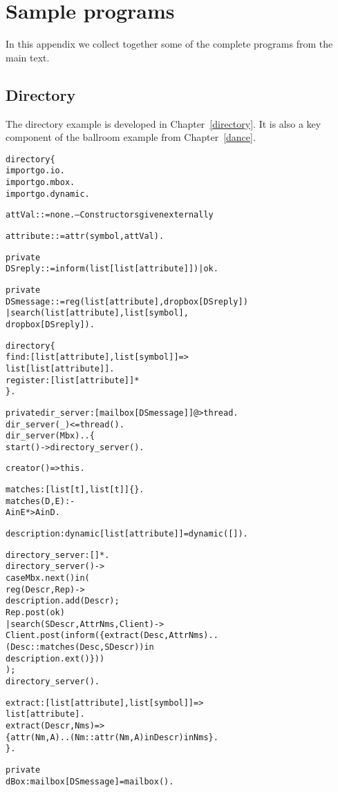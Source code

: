 \chapter{Sample programs}
\label{sample}
In this appendix we collect together some of the complete programs from the main text.

\section{Directory}
The directory example is developed in Chapter~\vref{directory}. It is also a key component of the ballroom example from Chapter~\vref{dance}.
\begin{alltt}
directory\{
  import go.io.
  import go.mbox.
  import go.dynamic.

  attVal ::= none.         -- Constructors given externally

  attribute ::= attr(symbol,attVal).

  private
  DSreply ::= inform(list[list[attribute]]) | ok.

  private
  DSmessage ::= reg(list[attribute],dropbox[DSreply])
    | search(list[attribute],list[symbol],
             dropbox[DSreply]).
              
  directory \typearrow \{
    find:[list[attribute],list[symbol]]=>
           list[list[attribute]].
    register:[list[attribute]]*
  \}.

  private dir_server:[mailbox[DSmessage]]@>thread.
  dir_server(_) <= thread().
  dir_server(Mbx)..\{
    start() -> directory_server().

    creator() => this.

    matches:[list[t],list[t]]\{\}.
    matches(D,E) :-
        A in E *> A in D.
    
    description:dynamic[list[attribute]]=dynamic([]).

    directory_server:[]*.
    directory_server() ->
      case Mbx.next() in (
        reg(Descr,Rep) ->
          description.add(Descr);
          Rep.post(ok)
      | search(SDescr, AttrNms,Client) ->
          Client.post(inform(\{ extract(Desc,AttrNms) ..
            (Desc::matches(Desc,SDescr)) in 
                description.ext()\}))
      );
      directory_server().

    extract:[list[attribute],list[symbol]]=>
                list[attribute].
    extract(Descr,Nms) =>
      \{attr(Nm,A) .. (Nm::attr(Nm,A) in Descr) in Nms\}.
  \}.

  private
  dBox:mailbox[DSmessage] = mailbox().


\end{alltt}
